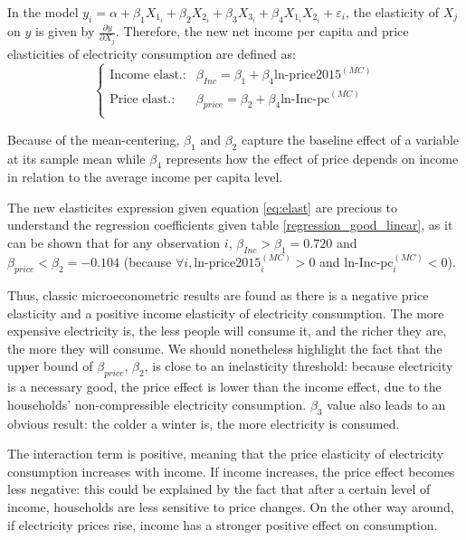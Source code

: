 In the model $y_i = \alpha + \beta_1 X_{1_i} + \beta_2 X_{2_i} + \beta_3 X_{3_i} + \beta_4  X_{1_i} X_{2_i} + \varepsilon_i$, the elasticity of $X_j$ on $y$ is given by $\frac{\partial y}{\partial X_j}$. Therefore, the new net income per capita and price elasticities of electricity consumption are defined as: 
\begin{equation} \label{eq:elast}
    \begin{cases}
    \text{Income elast.:} & \beta_{Inc} = \beta_1 + \beta_4 \text{ln-price2015}^{(MC)}\\
    \text{Price elast.:} & \beta_{price} =\beta_2 + \beta_4 \text{ln-Inc-pc}^{(MC)} \\    
    \end{cases}
\end{equation}

Because of the mean-centering, $\beta_1$ and $\beta_2$ capture the baseline effect of a variable at its sample mean while $\beta_4$ represents how the effect of price depends on income in relation to the average income per capita level.

The new elasticites expression given equation \eqref{eq:elast} are precious to understand the regression coefficients given table \ref{regression_good_linear}, as it can be shown that for any observation $i$, $\beta_{Inc} > \beta_1 = 0.720$ and $\beta_{price} < \beta_2 = -0.104$ (because $\forall i, \text{ln-price2015}^{(MC)}_i > 0$ and $\text{ln-Inc-pc}^{(MC)}_i < 0$). 

Thus, classic microeconometric results are found as there is a negative price elasticity and a positive income elasticity of electricity consumption. The more expensive electricity is, the less people will consume it, and the richer they are, the more they will consume. We should nonetheless highlight the fact that the upper bound of $\beta_{price}$, $\beta_2$, is close to an inelasticity threshold: because electricity is a necessary good, the price effect is lower than the income effect, due to the households' non-compressible electricity consumption. $\beta_3$ value also leads to an obvious result: the colder a winter is, the more electricity is consumed.

The interaction term is positive, meaning that the price elasticity of electricity consumption increases with income. If income increases, the price effect becomes less negative: this could be explained by the fact that after a certain level of income, households are less sensitive to price changes. On the other way around, if electricity prices rise, income has a stronger positive effect on consumption.

